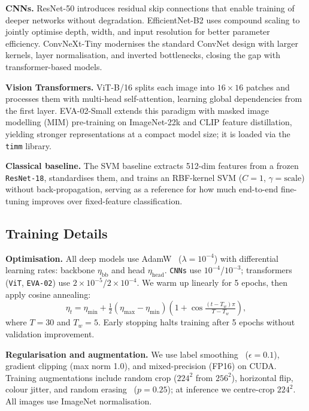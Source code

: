 \textbf{CNNs.} ResNet-50 introduces residual skip connections that enable training of deeper networks without degradation. EfficientNet-B2 uses compound scaling to jointly optimise depth, width, and input resolution for better parameter efficiency. ConvNeXt-Tiny modernises the standard ConvNet design with larger kernels, layer normalisation, and inverted bottlenecks, closing the gap with transformer-based models.

\textbf{Vision Transformers.} ViT-B/16 splits each image into $16{\times}16$ patches and processes them with multi-head self-attention, learning global dependencies from the first layer. EVA-02-Small extends this paradigm with masked image modelling (MIM) pre-training on ImageNet-22k and CLIP feature distillation, yielding stronger representations at a compact model size; it is loaded via the \texttt{timm} library.

\textbf{Classical baseline.} The SVM baseline extracts 512-dim features from a frozen \texttt{ResNet-18}, standardises them, and trains an RBF-kernel SVM ($C{=}1$, $\gamma{=}\text{scale}$) without back-propagation, serving as a reference for how much end-to-end fine-tuning improves over fixed-feature classification.

\subsection{Training Details}

\textbf{Optimisation.} All deep models use AdamW~\citep{loshchilov2017decoupled} ($\lambda{=}10^{-4}$) with differential learning rates: backbone $\eta_{\text{bb}}$ and head $\eta_{\text{head}}$. \texttt{CNNs} use $10^{-4}$/$10^{-3}$; transformers (\texttt{ViT}, \texttt{EVA-02}) use $2{\times}10^{-5}$/$2{\times}10^{-4}$. We warm up linearly for 5 epochs, then apply cosine annealing:
\begin{equation}
\eta_t = \eta_{\min} + \tfrac{1}{2}(\eta_{\max} - \eta_{\min})\!\left(1 + \cos \tfrac{(t - T_w)\pi}{T - T_w}\right),
\end{equation}
where $T{=}30$ and $T_w{=}5$. Early stopping halts training after 5 epochs without validation improvement.

\textbf{Regularisation and augmentation.} We use label smoothing~\citep{szegedy2016rethinking} ($\epsilon{=}0.1$), gradient clipping (max norm 1.0), and mixed-precision (FP16) on CUDA. Training augmentations include random crop ($224^2$ from $256^2$), horizontal flip, colour jitter, and random erasing~\citep{zhong2020random} ($p{=}0.25$); at inference we centre-crop $224^2$. All images use ImageNet normalisation.

